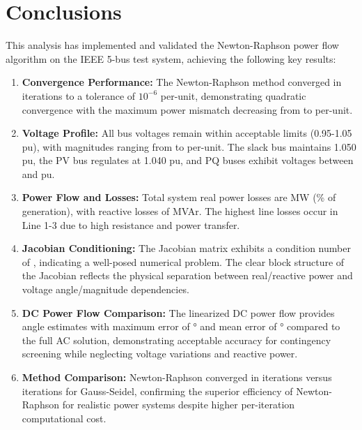 \documentclass[11pt,a4paper]{article}
\begin{document}
\section{Conclusions}

This analysis has implemented and validated the Newton-Raphson power flow algorithm on the IEEE 5-bus test system, achieving the following key results:

\begin{enumerate}
    \item \textbf{Convergence Performance:} The Newton-Raphson method converged in  iterations to a tolerance of $10^{-6}$ per-unit, demonstrating quadratic convergence with the maximum power mismatch decreasing from  to  per-unit.

    \item \textbf{Voltage Profile:} All bus voltages remain within acceptable limits (0.95-1.05 pu), with magnitudes ranging from  to  per-unit. The slack bus maintains 1.050 pu, the PV bus regulates at 1.040 pu, and PQ buses exhibit voltages between  and  pu.

    \item \textbf{Power Flow and Losses:} Total system real power losses are  MW (\% of generation), with reactive losses of  MVAr. The highest line losses occur in Line 1-3 due to high resistance and power transfer.

    \item \textbf{Jacobian Conditioning:} The Jacobian matrix exhibits a condition number of , indicating a well-posed numerical problem. The clear block structure of the Jacobian reflects the physical separation between real/reactive power and voltage angle/magnitude dependencies.

    \item \textbf{DC Power Flow Comparison:} The linearized DC power flow provides angle estimates with maximum error of ° and mean error of ° compared to the full AC solution, demonstrating acceptable accuracy for contingency screening while neglecting voltage variations and reactive power.

    \item \textbf{Method Comparison:} Newton-Raphson converged in  iterations versus  iterations for Gauss-Seidel, confirming the superior efficiency of Newton-Raphson for realistic power systems despite higher per-iteration computational cost.
\end{enumerate}
\end{document}
